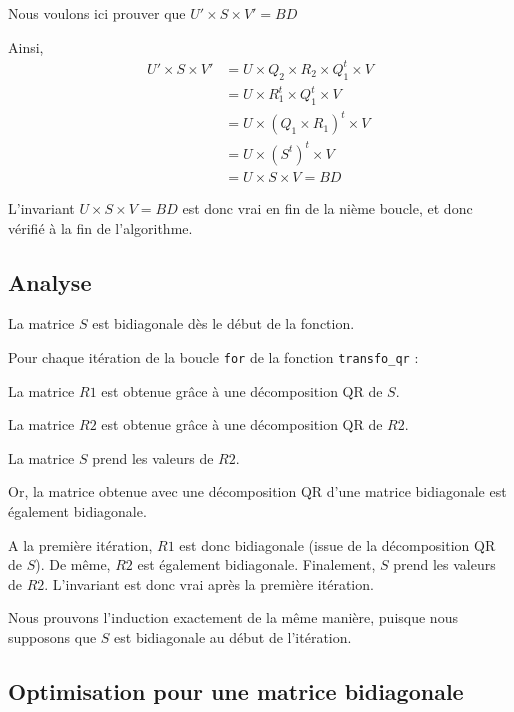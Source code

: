 \documentclass{article}
\begin{document}
\smallskip
Nous voulons ici prouver que $U' \times S \times V' = BD$

Ainsi,
\begin{align}
   U' \times S \times V' &= U \times Q_2 \times R_2 \times Q_1^t \times V \\
   &= U \times R_1^t \times Q_1^t \times V \\
   &= U \times (Q_1 \times R_1)^t \times V \\
   &= U \times (S^t)^t \times V \\
   &= U \times S \times V = BD
\end{align}

\smallskip

L'invariant $U \times S \times V = BD$ est donc vrai en fin de la nième boucle, et donc vérifié à la fin de l'algorithme.

\subsection{Analyse}
\label{ssec:analyse_qr}

La matrice $S$ est bidiagonale dès le début de la fonction.

Pour chaque itération de la boucle \verb|for| de la fonction \verb|transfo_qr| :
\smallskip

\noindent La matrice $R1$ est obtenue grâce à une décomposition QR de $S$.

\noindent La matrice $R2$ est obtenue grâce à une décomposition QR de $R2$.

\noindent La matrice $S$ prend les valeurs de $R2$.

\smallskip
Or, la matrice obtenue avec une décomposition QR d'une matrice bidiagonale est également bidiagonale.

A la première itération, $R1$ est donc bidiagonale (issue de la décomposition QR de $S$). De même, $R2$ est également bidiagonale. Finalement, $S$ prend les valeurs de $R2$. L'invariant est donc vrai après la première itération.

\smallskip

Nous prouvons l'induction exactement de la même manière, puisque nous supposons que $S$ est bidiagonale au début de l'itération.

\subsection{Optimisation pour une matrice bidiagonale}
\label{ssec:opti_bidiag_qr}
\end{document}
